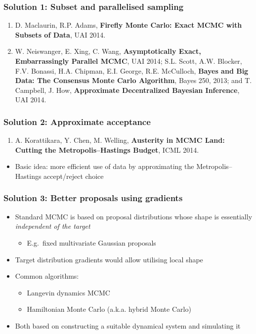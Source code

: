 \documentclass{beamer}
\begin{document}
\begin{frame}
  \frametitle{Solution 1: Subset and parallelised sampling}

  \begin{enumerate}
  \item D. Maclaurin, R.P. Adams, \textbf{Firefly Monte Carlo: Exact MCMC with Subsets of Data}, UAI 2014.
  \item W. Neiswanger, E. Xing, C. Wang, \textbf{Asymptotically Exact, Embarrassingly Parallel MCMC}, UAI 2014; S.L. Scott, A.W. Blocker, F.V. Bonassi, H.A. Chipman, E.I. George, R.E. McCulloch, \textbf{Bayes and Big Data: The Consensus Monte Carlo Algorithm}, Bayes 250, 2013; and T. Campbell, J. How, \textbf{Approximate Decentralized Bayesian Inference}, UAI 2014. 
  \end{enumerate}
\end{frame}

\begin{frame}
  \frametitle{Solution 2: Approximate acceptance}

  \begin{enumerate}
  \item A. Korattikara, Y. Chen, M. Welling, \textbf{Austerity in MCMC Land: Cutting the Metropolis--Hastings Budget}, ICML 2014.
  \end{enumerate}

  \begin{itemize}
  \item Basic idea: more efficient use of data by approximating the
    Metropolis--Hastings accept/reject choice
  \end{itemize}
\end{frame}

\begin{frame}
  \frametitle{Solution 3: Better proposals using gradients}

  \begin{itemize}
  \item Standard MCMC is based on proposal distributions whose shape is
    essentially \emph{independent of the target}
    \begin{itemize}
    \item E.g.~fixed multivariate Gaussian proposals
    \end{itemize}
  \item Target distribution gradients would allow utilising local shape
  \item Common algorithms:
    \begin{itemize}
    \item Langevin dynamics MCMC
    \item Hamiltonian Monte Carlo  (a.k.a. hybrid Monte Carlo)
    \end{itemize}
  \item Both based on constructing a suitable dynamical system and
    simulating it
  \end{itemize}
\end{frame}
\end{document}
